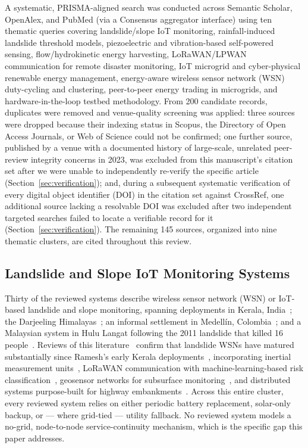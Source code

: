 \documentclass[electronics,article,submit,moreauthors]{Definitions/mdpi}
\begin{document}
A systematic, PRISMA-aligned search was conducted across Semantic Scholar, OpenAlex, and PubMed (via a Consensus aggregator interface) using ten thematic queries covering landslide/slope IoT monitoring, rainfall-induced landslide threshold models, piezoelectric and vibration-based self-powered sensing, flow/hydrokinetic energy harvesting, LoRaWAN/LPWAN communication for remote disaster monitoring, IoT microgrid and cyber-physical renewable energy management, energy-aware wireless sensor network (WSN) duty-cycling and clustering, peer-to-peer energy trading in microgrids, and hardware-in-the-loop testbed methodology. From 200 candidate records, duplicates were removed and venue-quality screening was applied: three sources were dropped because their indexing status in Scopus, the Directory of Open Access Journals, or Web of Science could not be confirmed; one further source, published by a venue with a documented history of large-scale, unrelated peer-review integrity concerns in 2023, was excluded from this manuscript's citation set after we were unable to independently re-verify the specific article (Section~\ref{sec:verification}); and, during a subsequent systematic verification of every digital object identifier (DOI) in the citation set against CrossRef, one additional source lacking a resolvable DOI was excluded after two independent targeted searches failed to locate a verifiable record for it (Section~\ref{sec:verification}). The remaining 145 sources, organized into nine thematic clusters, are cited throughout this review.

\subsection{Landslide and Slope IoT Monitoring Systems}

Thirty of the reviewed systems describe wireless sensor network (WSN) or IoT-based landslide and slope monitoring, spanning deployments in Kerala, India~\cite{ref2,ref12,ref20}; the Darjeeling Himalayas~\cite{ref18}; an informal settlement in Medell\'in, Colombia~\cite{ref14}; and a Malaysian system in Hulu Langat following the 2011 landslide that killed 16 people~\cite{ref21}. Reviews of this literature~\cite{ref22,ref23} confirm that landslide WSNs have matured substantially since Ramesh's early Kerala deployments~\cite{ref2,ref12,ref20}, incorporating inertial measurement units~\cite{ref2}, LoRaWAN communication with machine-learning-based risk classification~\cite{ref4,ref5}, geosensor networks for subsurface monitoring~\cite{ref9}, and distributed systems purpose-built for highway embankments~\cite{ref26}. Across this entire cluster, every reviewed system relies on either periodic battery replacement, solar-only backup, or --- where grid-tied --- utility fallback. No reviewed system models a no-grid, node-to-node service-continuity mechanism, which is the specific gap this paper addresses.
\end{document}
